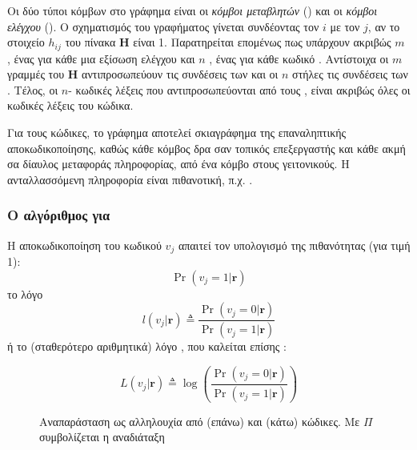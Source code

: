 Οι δύο τύποι κόμβων στο γράφημα  είναι οι \textit{κόμβοι μεταβλητών} () και οι \textit{κόμβοι ελέγχου} (). Ο σχηματισμός του γραφήματος  γίνεται συνδέοντας τον  $i$ με τον  $j$, αν το στοιχείο $h_{ij}$ του πίνακα $\mathbf{H}$ είναι 1. Παρατηρείται επομένως πως υπάρχουν ακριβώς $m$ , ένας για κάθε μια εξίσωση ελέγχου και $n$ , ένας για κάθε κωδικό . Αντίστοιχα οι $m$ γραμμές του $\mathbf{H}$ αντιπροσωπεύουν τις συνδέσεις των  και οι $n$ στήλες τις συνδέσεις των . Τέλος, οι $n$- κωδικές λέξεις που αντιπροσωπεύονται από τους , είναι ακριβώς όλες οι κωδικές λέξεις του κώδικα.

Για τους  κώδικες, το γράφημα  αποτελεί σκιαγράφημα της επαναληπτικής αποκωδικοποίησης, καθώς κάθε κόμβος δρα σαν τοπικός επεξεργαστής και κάθε ακμή σα δίαυλος μεταφοράς πληροφορίας, από ένα κόμβο στους γειτονικούς. Η ανταλλασσόμενη πληροφορία είναι πιθανοτική, π.χ.  \cite{ryan2009channel}.

\subsubsection{Ο  αλγόριθμος για }

Η αποκωδικοποίηση του κωδικού  $v_j$ απαιτεί τον υπολογισμό της  πιθανότητας (για τιμή  1):
\begin{equation*}
\Pr(v_j=1|\mathbf{r})
\end{equation*}
το λόγο 
\begin{equation*}
l(v_j|\mathbf{r})\triangleq\frac{\Pr(v_j=0|\mathbf{r})}{\Pr(v_j=1|\mathbf{r})}
\end{equation*}
ή το (σταθερότερο αριθμητικά) λόγο , που καλείται επίσης :

\begin{equation}
L(v_j|\mathbf{r})\triangleq\log\left(\frac{\Pr(v_j=0|\mathbf{r})}{\Pr(v_j=1|\mathbf{r})}\right)
\label{eq:LLR}
\end{equation}

\begin{figure}[h]
\caption{Αναπαράσταση  ως αλληλουχία από  (επάνω) και  (κάτω) κώδικες. Με $\Pi$ συμβολίζεται η αναδιάταξη}
\label{fig:LDPC graphical}
\end{figure}

